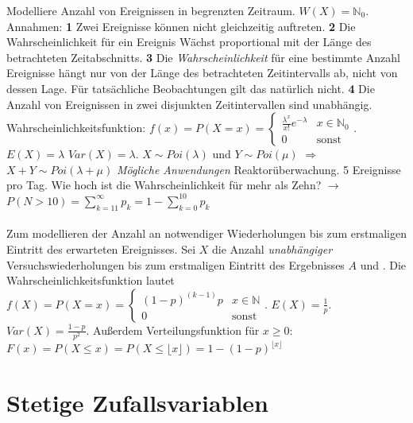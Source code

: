  Modelliere Anzahl von Ereignissen in begrenzten Zeitraum. $W(X) = \mathds{N}_0$. Annahmen: \textbf{1} Zwei Ereignisse können nicht gleichzeitig auftreten. \textbf{2} Die Wahrscheinlichkeit für ein Ereignis Wächst proportional mit der Länge des betrachteten Zeitabschnitts. \textbf{3} Die \emph{Wahrscheinlichkeit} für eine bestimmte Anzahl Ereignisse hängt nur von der Länge des betrachteten Zeitintervalls ab, nicht von dessen Lage. Für tatsächliche Beobachtungen gilt das natürlich nicht. \textbf{4} Die Anzahl von Ereignissen in zwei disjunkten Zeitintervallen sind unabhängig. Wahrscheinlichkeitsfunktion: $f(x) = P(X=x) = \begin{cases}
    \frac{\lambda^x}{x!}e^{-\lambda} & x \in \mathds{N}_0\\
    0 & \text{sonst}
\end{cases}$. $E(X) = \lambda$ $Var(X) = \lambda$. $X \sim Poi(\lambda)$ und $Y \sim Poi(\mu)$ $\Rightarrow$ $X + Y \sim Poi(\lambda + \mu)$ \emph{Mögliche Anwendungen} Reaktorüberwachung. 5 Ereignisse pro Tag. Wie hoch ist die Wahrscheinlichkeit für mehr als Zehn? $\rightarrow$ $P(N > 10) = \sum_{k=11}^\infty p_k = 1 - \sum_{k=0}^{10}p_k$ \\\\
 Zum modellieren der Anzahl an notwendiger Wiederholungen bis zum erstmaligen Eintritt des erwarteten Ereignisses. Sei $X$ die Anzahl \emph{unabhängiger} Versuchswiederholungen bis zum erstmaligen Eintritt des Ergebnisses $A$ und . Die Wahrscheinlichkeitsfunktion lautet $f(X) = P(X = x) = \begin{cases}
    (1 - p) ^ (k-1) p & x \in \mathds{N}\\
    0 & \text{sonst}
\end{cases}$. $E(X) = \frac{1}{p}$. $Var(X) = \frac{1-p}{p^2}$. Außerdem Verteilungsfunktion für $x \ge 0$: $F(x) = P(X \le x) = P(X \le \lfloor x\rfloor) = 1 - (1 - p)^{\lfloor x\rfloor}$



\section{Stetige Zufallsvariablen}

